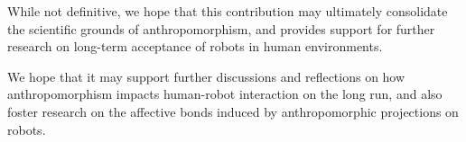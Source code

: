 \documentclass{sig-alternate-2013}
\begin{document}
While not definitive, we hope that this contribution may ultimately consolidate
the scientific grounds of anthropomorphism, and provides support for further
research on long-term acceptance of robots in human environments.

We hope that it may support further
discussions and reflections on how anthropomorphism impacts human-robot
interaction on the long run, and also foster research on the affective bonds
induced by anthropomorphic projections on robots.



 
\end{document}
